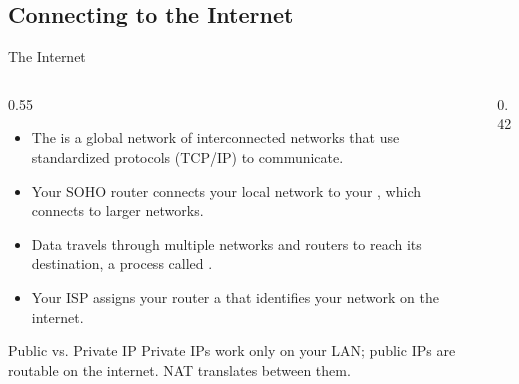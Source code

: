 \documentclass[aspectratio=169]{beamer}  %
\begin{document}
\subsection{Connecting to the Internet}

\begin{frame}{The Internet}
    \begin{columns}[T]
        \begin{column}{0.55\textwidth}
            \small
            \begin{itemize}
                \item The  is a global network of interconnected networks that use standardized protocols (TCP/IP) to communicate.
                \item Your SOHO router connects your local network to your , which connects to larger networks.
                \item Data travels through multiple networks and routers to reach its destination, a process called .
                \item Your ISP assigns your router a  that identifies your network on the internet.
            \end{itemize}
            
            \begin{alertblock}{Public vs. Private IP}
                \scriptsize
                Private IPs work only on your LAN; public IPs are routable on the internet. NAT translates between them.
            \end{alertblock}
        \end{column}
        \begin{column}{0.42\textwidth}
            \begin{center}
\end{center}
\end{column}
\end{columns}
\end{frame}
\end{document}
